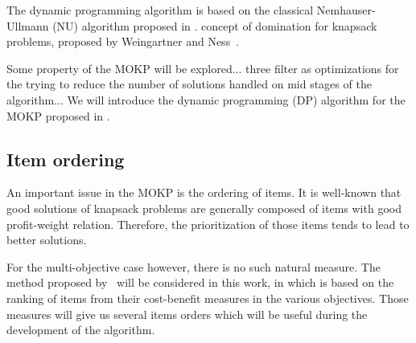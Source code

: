 

The dynamic programming algorithm is based on the classical Nemhauser-Ullmann (NU) algorithm proposed
in \cite{nemhauser1969discrete}.
concept of domination for knapsack problems,
proposed by Weingartner and Ness~\cite{weingartner1967methods}.

Some property of the MOKP will be explored...
three filter as optimizations for the trying
to reduce the number of solutions
handled on mid stages of the algorithm...
We will introduce the dynamic programming (DP) algorithm for the MOKP proposed in \cite{bazgan2009}.


\subsection{Item ordering}

An important issue in the MOKP is the ordering of items.
It is well-known that good solutions of knapsack problems
are generally composed of items with good profit-weight relation.
Therefore, the prioritization of those items tends to lead to better solutions.

For the multi-objective case however, there is no such natural measure.
The method proposed by~\cite{bazgan2009} will be considered in this work, in which is based on the ranking of items from their cost-benefit measures in the various objectives.
Those measures will give us several items orders which will be useful during the development of the algorithm.


